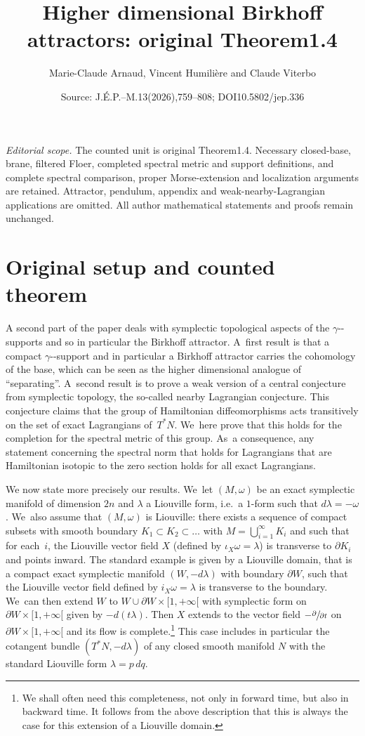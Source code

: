 \documentclass[10pt,a4paper]{amsart}
\title[Compact spectral-support cohomology]{Higher dimensional Birkhoff attractors: original Theorem1.4}
\author{Marie-Claude Arnaud, Vincent Humili\`ere and Claude Viterbo}
\date{Source: J.\'E.P.--M.13(2026),759--808; DOI10.5802/jep.336}
\newcommand{\ie}{i.e.\ }
\providecommand{\nobreakdash}{\nobreak\hbox{-}}
\theoremstyle{definition}
\begin{document}
\maketitle
\noindent\textit{Editorial scope.} The counted unit is original Theorem1.4. Necessary closed-base, brane, filtered Floer, completed spectral metric and support definitions, and complete spectral comparison, proper Morse-extension and localization arguments are retained. Attractor, pendulum, appendix and weak-nearby-Lagrangian applications are omitted. All author mathematical statements and proofs remain unchanged.
\section{Original setup and counted theorem}
A second part of the paper deals with symplectic topological aspects of the $\gamma$\nobreakdash-supports and so in particular the Birkhoff attractor. A~first result is that a compact $\gamma$\nobreakdash-support and in particular a Birkhoff attractor carries the cohomology of the base, which can be seen as the higher dimensional analogue of ``separating''. A~second result is to prove a weak version of a central conjecture from symplectic topology, the so-called nearby Lagrangian conjecture. This conjecture claims that the group of Hamiltonian diffeomorphisms acts transitively on the set of exact Lagrangians of~$T^*N$. We~here prove that this holds for the completion for the spectral metric of this group. As~a consequence, any statement concerning the spectral norm that holds for Lagrangians that are Hamiltonian isotopic to the zero section holds for all exact Lagrangians.

We now state more precisely our results. We~let $(M,\omega)$ be an exact symplectic manifold of dimension $2n$ and $\lambda$ a Liouville form, \ie a $1$-form such that $d\lambda=-\omega$. We~also assume that $(M,\omega)$ is Liouville:
there exists a sequence of compact subsets with smooth boundary $K_1\subset K_2\subset \dots $ with $M=\bigcup_{i=1}^\infty K_i$ and such that for each~$i$, the Liouville vector field $X$ (defined by $\iota_X\omega=\lambda$) is transverse to $\partial K_i$ and points inward.
The standard example is given by a Liouville domain, that is
a compact exact symplectic manifold $(W, -d\lambda)$ with boundary $\partial W$, such that the Liouville vector field defined by $i_X\omega=\lambda$ is transverse to the boundary. We~can then extend $W$ to $W\cup \partial W\times [1,+\infty[$ with symplectic form on $\partial W\times [1,+\infty[$ given by
$-d(t\lambda)$. Then $X$ extends to the vector field $- \sfrac{\partial}{\partial t}$ on $\partial W\times [1,+\infty[$ and its flow is complete.\footnote{We shall often need this completeness, not only in forward time, but also in backward time. It follows from the above description that this is always the case for this extension of a Liouville domain.} This case includes in particular the cotangent bundle $(T^*N, -d\lambda)$ of any closed smooth manifold $N$ with the standard Liouville form $\lambda=p\,dq$.
\end{document}
